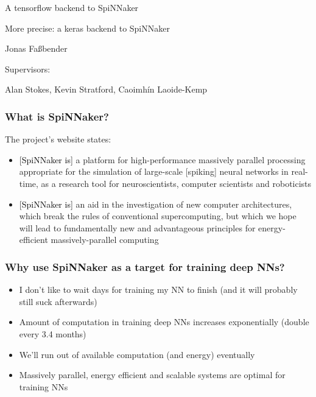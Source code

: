 \documentclass{beamer}
\begin{document}
\begin{frame}
\begin{center}
{\Large A tensorflow backend to SpiNNaker }

More precise: a keras backend to SpiNNaker

\vspace{2cm}

Jonas Fa{\ss}bender

\vspace{2cm}

Supervisors:

Alan Stokes, Kevin Stratford, Caoimhín Laoide-Kemp

\end{center}
\end{frame}

\begin{frame}[fragile]
  \frametitle{What is SpiNNaker?}
  \pause

  The project's website \cite{spinnaker_project} states:
  \begin{itemize}[<+->]
    \item \textcolor{black}{[SpiNNaker is]} a platform for
          high-performance massively parallel processing
          appropriate for the simulation of large-scale
          [spiking] neural networks in real-time, as a
          research tool for neuroscientists, computer
          scientists and roboticists

    \item \textcolor{black}{[SpiNNaker is]} an aid in the
          investigation of new computer architectures,
          which break the rules of conventional
          supercomputing, but which we hope will lead to
          fundamentally new and advantageous principles for
          energy-efficient massively-parallel computing
  \end{itemize}
\end{frame}

\begin{frame}[fragile]
  \frametitle{Why use SpiNNaker as a target for training deep NNs?}
  \pause

  \begin{itemize}[<+->]
    \item I don't like to wait days for training my NN to
          finish (and it will probably still suck
          afterwards)
    \item Amount of computation in training deep NNs
          increases exponentially (double every 3.4 months)
          \cite{openai2019}
    \item We'll run out of available computation (and
          energy) eventually
    \item Massively parallel, energy efficient and scalable
          systems are optimal for training NNs
  \end{itemize}
\end{frame}
\end{document}
